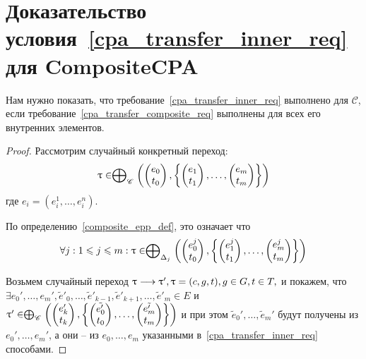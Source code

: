\section{Доказательство условия~\ref{cpa_transfer_inner_req} для CompositeCPA}
\label{sect_composite_transfer_proof}

Нам нужно показать, что требование~\ref{cpa_transfer_inner_req} выполнено для $\mathscr{C}$, если требование~\ref{cpa_transfer_composite_req} выполнены для всех его внутренних элементов. 

\begin{proof}
Рассмотрим случайный конкретный переход:
$$\uptau \in  \mathrel{\bigoplus}_{\mathscr{C}}
\left(
\begin{pmatrix}
e_0 \\
t_0 
\end{pmatrix},
\left\{
\begin{pmatrix}
e_1 \\
t_1 
\end{pmatrix},
\dots ,
\begin{pmatrix}
e_m \\
t_m 
\end{pmatrix}
\right\}
\right)$$
где $e_i=(e^1_i, \dots, e^n_i)$.

По определению~\ref{composite_epp_def}, это означает что
$$\forall j: 1\leqslant j \leqslant m: \uptau \in  \mathrel{\bigoplus}_{\Delta_j}
\left(
\begin{pmatrix}
e^j_0 \\
t_0 
\end{pmatrix},
\left\{
\begin{pmatrix}
e^j_1 \\
t_1 
\end{pmatrix},
\dots ,
\begin{pmatrix}
e^j_m \\
t_m 
\end{pmatrix}
\right\}
\right)$$

Возьмем случайный переход
$ \uptau \longrightarrow \uptau', \uptau=(c,g,t), g \in G, t \in T, $ и покажем, что 
$\exists e_0', \dots, e_m', \tilde{e}'_0, \dots, \tilde{e}'_{k-1}, \tilde{e}'_{k+1}, \dots, \tilde{e}'_m \in E$ и
$\uptau' \in  \mathrel{\bigoplus}_{\mathscr{C}}
\left(
\begin{pmatrix}
e'_k \\
t_k 
\end{pmatrix},
\left\{
\begin{pmatrix}
\tilde{e'_0} \\
t_0 
\end{pmatrix},
\dots ,
\begin{pmatrix}
\tilde{e'_m} \\
t_m 
\end{pmatrix}
\right\}
\right)$ 
и при этом $\tilde{e}_0', \dots, \tilde{e}_m'$ будут получены из $e_0', \dots, e_m'$, а они -- из $e_0, \dots, e_m$ указанными в~\ref{cpa_transfer_inner_req} способами.


\end{proof}
